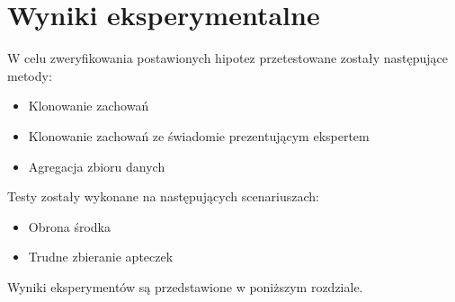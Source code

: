 \chapter{Wyniki eksperymentalne}

W celu zweryfikowania postawionych hipotez przetestowane zostały następujące metody:

\begin{itemize}
\item{Klonowanie zachowań}
\item{Klonowanie zachowań ze świadomie prezentującym ekspertem}
\item{Agregacja zbioru danych}
\end{itemize}

Testy zostały wykonane na następujących scenariuszach:

\begin{itemize}
\item{Obrona środka}
\item{Trudne zbieranie apteczek}
\end{itemize}

Wyniki eksperymentów są przedstawione w poniższym rozdziale.








